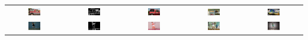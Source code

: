 \begin{table}[hbp]
{\begin{tabular}{c c c c c}
            \includegraphics[width=0.23\textwidth]{./assets/base_image_00065485.pdf} & \includegraphics[width=0.23\textwidth]{./assets/hed_image_00065485.pdf} & \includegraphics[width=0.23\textwidth]{./assets/piti_image_00065485.pdf} & \includegraphics[width=0.23\textwidth]{./assets/control_image_00065485.pdf} & \includegraphics[width=0.23\textwidth]{./assets/prompt_control_image_00065485.pdf} \\
            \includegraphics[width=0.23\textwidth]{./assets/base_image_00065736.pdf} & \includegraphics[width=0.23\textwidth]{./assets/hed_image_00065736.pdf} & \includegraphics[width=0.23\textwidth]{./assets/piti_image_00065736.pdf} & \includegraphics[width=0.23\textwidth]{./assets/control_image_00065736.pdf} & \includegraphics[width=0.23\textwidth]{./assets/prompt_control_image_00065736.pdf} \\

\end{tabular}}
\end{table}
